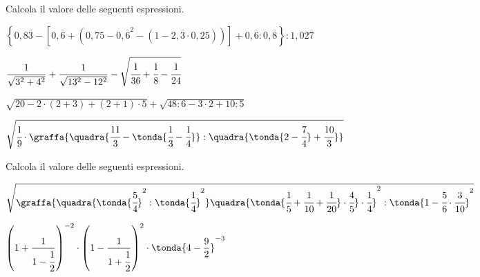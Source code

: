 \begin{esercizio}[*]
\label{ese:3.157}
 Calcola il valore delle seguenti espressioni.
\begin{enumeratees}
\spazielenx
\item \(\displaystyle{\left\{0,8\overline{3}-\left[0,\overline{6}+(0,75-{0,
\overline{6}}^{2}-(1-2,\overline{3}\cdot%
0,25))\right]+0,\overline{6}:0,\overline{8}\right\}:1,02\overline{7}}\)
\item 
\(\displaystyle{\frac{1}{\sqrt{3^{2}+4^{2}}}+\frac{1}{\sqrt{13^{2}-12^2}}-
\sqrt{\cfrac{1}{36}+\cfrac{1}{8}%
-\cfrac{1}{24}}}\)
\item \(\displaystyle{\sqrt{20-2\cdot(2+3)+(2+1)\cdot5}+\sqrt{48:6-3
\cdot2+10:5}}\)
\item \(\displaystyle{\sqrt{\cfrac{1}{9}\cdot\graffa{\quadra{\cfrac{11}{3}-
\tonda{\cfrac{1}{3}-\cfrac{1}{4}}}:%
\quadra{\tonda{2-\cfrac{7}{4}}+\cfrac{10}{3}}}}}\)
\end{enumeratees}
\end{esercizio}

\begin{esercizio}[*]
\label{ese:3.158}
 Calcola il valore delle seguenti espressioni.
\begin{enumeratees}
\spazielenx
\item \(\displaystyle{\sqrt{\graffa{\quadra{\tonda{\cfrac{5}{4}}^{2}:
\tonda{\cfrac{1}{4}}^{2}}%
\quadra{\tonda{\cfrac{1}{5}+\cfrac{1}{10}+\cfrac{1}{20}}\cdot\cfrac{4}{5}
}\cdot\cfrac{1}{4}}^{2}%
:\tonda{1-\cfrac{5}{6}\cdot\cfrac{3}{10}}^{2}}}\)
\item \(\displaystyle{\left(1+\frac{1}{1-\cfrac{1}{2}}\right)^{-2}\cdot
\left(1-\frac{1}{1+\cfrac{1}{2}}\right)^{2}\cdot%
\tonda{4-\frac{9}{2}}^{-3}}\)
\end{enumeratees}
\end{esercizio}

